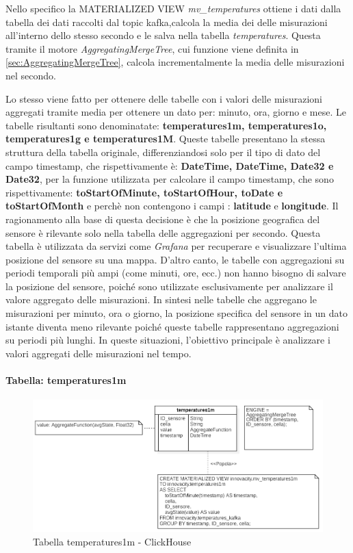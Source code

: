     Nello specifico la MATERIALIZED VIEW \textit{mv\_temperatures} ottiene i dati dalla tabella dei dati raccolti dal topic kafka,calcola la media dei delle misurazioni all'interno dello stesso secondo e le salva nella tabella \textit{temperatures}.
    Questa tramite il motore \textit{AggregatingMergeTree}, cui funzione viene definita in \ref*{sec:AggregatingMergeTree}, calcola incrementalmente la media delle misurazioni nel secondo.

    Lo stesso viene fatto per ottenere delle tabelle con i valori delle misurazioni aggregati tramite media per ottenere un dato per: minuto, ora, giorno e mese.
    Le tabelle risultanti sono denominatate: \textbf{temperatures1m, temperatures1o, temperatures1g e temperatures1M}. Queste tabelle presentano la stessa struttura della tabella originale, differenziandosi solo per il tipo di dato del campo timestamp, che rispettivamente è: \textbf{DateTime, DateTime, Date32 e Date32}, per la funzione utilizzata per calcolare il campo timestamp, che sono rispettivamente: \textbf{toStartOfMinute, toStartOfHour, toDate e toStartOfMonth} e perchè non contengono i campi : \textbf{latitude} e \textbf{longitude}.
    Il ragionamento alla base di questa decisione è che la posizione geografica del sensore è rilevante solo nella tabella delle aggregazioni per secondo. Questa tabella è utilizzata da servizi come \textit{Grafana} per recuperare e visualizzare l'ultima posizione del sensore su una mappa. D'altro canto, le tabelle con aggregazioni su periodi temporali più ampi (come minuti, ore, ecc.) non hanno bisogno di salvare la posizione del sensore, poiché sono utilizzate esclusivamente per analizzare il valore aggregato delle misurazioni.
    In sintesi nelle tabelle che aggregano le misurazioni per minuto, ora o giorno, la posizione specifica del sensore in un dato istante diventa meno rilevante poiché queste tabelle rappresentano aggregazioni su periodi più lunghi. In queste situazioni, l'obiettivo principale è analizzare i valori aggregati delle misurazioni nel tempo. 

    \paragraph{Tabella: temperatures1m}
    \begin{figure}[H]
        \centering
        \includegraphics[width=1\textwidth]{../Images/SpecificaTecnica/temperatures1m.PNG}
        \caption{Tabella temperatures1m - ClickHouse}
        \label{fig:temperatures1m}
      \end{figure}
